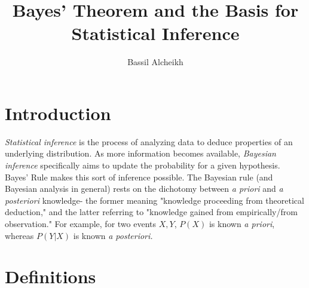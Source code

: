 \documentclass[a4paper]{article}
\title{Bayes' Theorem and the Basis for Statistical Inference}
\author{Bassil Alcheikh}
\theoremstyle{definition}
\begin{document}
\maketitle

\section{Introduction}
\textit{Statistical inference} is the process of analyzing data to deduce properties of an underlying distribution. As more information becomes available, \textit{Bayesian inference} specifically aims to update the probability for a given hypothesis. Bayes' Rule makes this sort of inference possible.
\bigbreak
The Bayesian rule (and Bayesian analysis in general) rests on the dichotomy between \textit{a priori} and \textit{a posteriori} knowledge- the former meaning "knowledge proceeding from theoretical deduction," and the latter referring to "knowledge gained from empirically/from observation." For example, for two events $X, Y$, $P(X)$ is known \textit{a priori}, whereas $P(Y|X)$ is known \textit{a posteriori.}
\section{Definitions}
\end{document}
